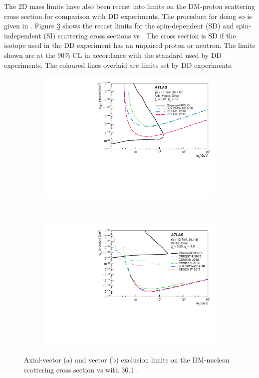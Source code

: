 The 2D mass limits have also been recast into limits on the DM-proton scattering cross section for comparison with DD experiments. The procedure for doing so is given in \cite{Boveia:2016mrp}. Figure \ref{fig:xsec} shows the recast \monoZ limits for the spin-dependent (SD) and spin-independent (SI) scattering cross sections vs \mmed. The cross section is SD if the isotope used in the DD experiment has an unpaired proton or neutron. The limits shown are at the 90\% CL in accordance with the standard used by DD experiments. The coloured lines overlaid are limits set by DD experiments.

\begin{figure}[htb]
    \centering
    \begin{subfigure}[b]{0.48\textwidth}
        \includegraphics[width=\textwidth]{Figures/xsec_dmA.pdf}
        \label{fig:xsec_dmA}
    \end{subfigure}
    ~ %
    \begin{subfigure}[b]{0.48\textwidth}
        \includegraphics[width=\textwidth]{Figures/xsec_dmV.pdf}
        \label{fig:xsec_dmV}
    \end{subfigure}
    \caption{Axial-vector (a) and vector (b) exclusion limits on the DM-nucleon scattering cross section vs \mmed with 36.1 \ifb.}
\label{fig:xsec}
\end{figure}

